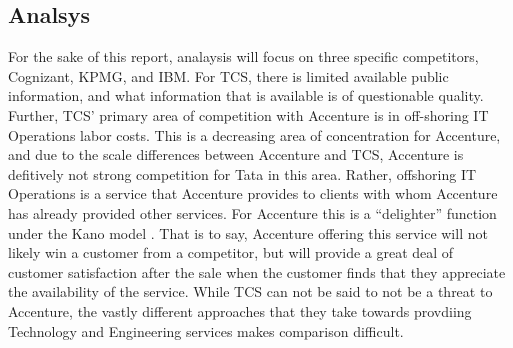 \subsection{Analsys}

For the sake of this report, analaysis will focus on three specific competitors, Cognizant, KPMG, and IBM. For TCS, there is limited available public information, and what information that is available is of questionable quality. Further, TCS' primary area of competition with Accenture is in off-shoring IT Operations labor costs. This is a decreasing area of concentration for Accenture, and due to the scale differences between Accenture and TCS, Accenture is defitively not strong competition for Tata in this area. Rather, offshoring IT Operations is a service that Accenture provides to clients with whom Accenture has already provided other services. For Accenture this is a ``delighter'' function under the Kano model \parencite{xuCustomerRequirementAnalysis2007}. That is to say, Accenture offering this service will not likely win a customer from a competitor, but will provide a great deal of customer satisfaction after the sale when the customer finds that they appreciate the availability of the service. While TCS can not be said to not be a threat to Accenture, the vastly different approaches that they take towards provdiing Technology and Engineering services makes comparison difficult.



